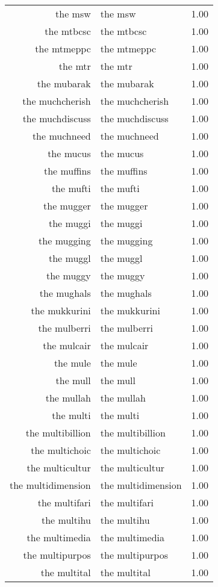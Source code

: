 \begin{table}[ht]
\begin{tabular}{rlr}
  the msw & the msw & 1.00 \\ 
  the mtbcsc & the mtbcsc & 1.00 \\ 
  the mtmeppc & the mtmeppc & 1.00 \\ 
  the mtr & the mtr & 1.00 \\ 
  the mubarak & the mubarak & 1.00 \\ 
  the muchcherish & the muchcherish & 1.00 \\ 
  the muchdiscuss & the muchdiscuss & 1.00 \\ 
  the muchneed & the muchneed & 1.00 \\ 
  the mucus & the mucus & 1.00 \\ 
  the muffins & the muffins & 1.00 \\ 
  the mufti & the mufti & 1.00 \\ 
  the mugger & the mugger & 1.00 \\ 
  the muggi & the muggi & 1.00 \\ 
  the mugging & the mugging & 1.00 \\ 
  the muggl & the muggl & 1.00 \\ 
  the muggy & the muggy & 1.00 \\ 
  the mughals & the mughals & 1.00 \\ 
  the mukkurini & the mukkurini & 1.00 \\ 
  the mulberri & the mulberri & 1.00 \\ 
  the mulcair & the mulcair & 1.00 \\ 
  the mule & the mule & 1.00 \\ 
  the mull & the mull & 1.00 \\ 
  the mullah & the mullah & 1.00 \\ 
  the multi & the multi & 1.00 \\ 
  the multibillion & the multibillion & 1.00 \\ 
  the multichoic & the multichoic & 1.00 \\ 
  the multicultur & the multicultur & 1.00 \\ 
  the multidimension & the multidimension & 1.00 \\ 
  the multifari & the multifari & 1.00 \\ 
  the multihu & the multihu & 1.00 \\ 
  the multimedia & the multimedia & 1.00 \\ 
  the multipurpos & the multipurpos & 1.00 \\ 
  the multital & the multital & 1.00 \\ 

\end{tabular}
\end{table}
